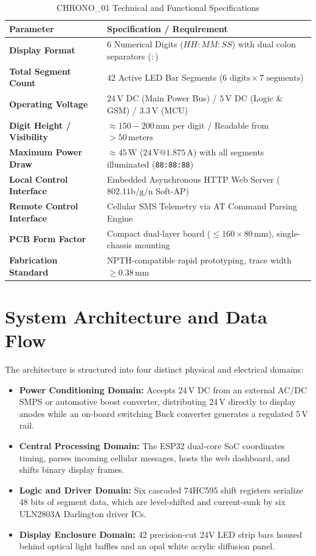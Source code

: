 \documentclass[12pt,a4paper,oneside]{report}
\begin{document}
\begin{table}[H]
\centering
\caption{CHRONO\_01 Technical and Functional Specifications}
\label{tab:cahier_des_charges}
\begin{tabularx}{\textwidth}{lX}
\toprule
\textbf{Parameter} & \textbf{Specification / Requirement} \\
\midrule
\textbf{Display Format} & 6 Numerical Digits ($HH:MM:SS$) with dual colon separators ($:$) \\
\textbf{Total Segment Count} & 42 Active LED Bar Segments ($6 \text{ digits} \times 7 \text{ segments}$) \\
\textbf{Operating Voltage} & $24\,\text{V}$ DC (Main Power Bus) / $5\,\text{V}$ DC (Logic \& GSM) / $3.3\,\text{V}$ (MCU) \\
\textbf{Digit Height / Visibility} & $\approx 150 - 200\,\text{mm}$ per digit / Readable from $> 50\,\text{meters}$ \\
\textbf{Maximum Power Draw} & $\approx 45\,\text{W}$ ($24\,\text{V} @ 1.875\,\text{A}$) with all segments illuminated (\texttt{88:88:88}) \\
\textbf{Local Control Interface} & Embedded Asynchronous HTTP Web Server ($802.11\text{b/g/n}$ Soft-AP) \\
\textbf{Remote Control Interface} & Cellular SMS Telemetry via AT Command Parsing Engine \\
\textbf{PCB Form Factor} & Compact dual-layer board ($\le 160 \times 80\,\text{mm}$), single-chassis mounting \\
\textbf{Fabrication Standard} & NPTH-compatible rapid prototyping, trace width $\ge 0.38\,\text{mm}$ \\
\bottomrule
\end{tabularx}
\end{table}

\section{System Architecture and Data Flow}
The architecture is structured into four distinct physical and electrical domains:
\begin{itemize}
    \item \textbf{Power Conditioning Domain:} Accepts $24\,\text{V}$ DC from an external AC/DC SMPS or automotive boost converter, distributing $24\,\text{V}$ directly to display anodes while an on-board switching Buck converter generates a regulated $5\,\text{V}$ rail.
    \item \textbf{Central Processing Domain:} The ESP32 dual-core SoC coordinates timing, parses incoming cellular messages, hosts the web dashboard, and shifts binary display frames.
    \item \textbf{Logic and Driver Domain:} Six cascaded 74HC595 shift registers serialize 48 bits of segment data, which are level-shifted and current-sunk by six ULN2803A Darlington driver ICs.
    \item \textbf{Display Enclosure Domain:} 42 precision-cut 24V LED strip bars housed behind optical light baffles and an opal white acrylic diffusion panel.
\end{itemize}
\end{document}
